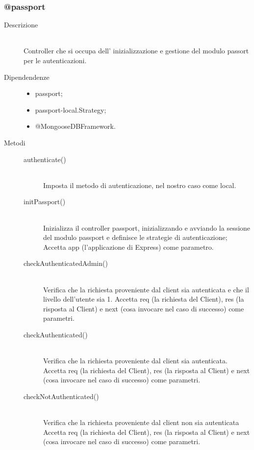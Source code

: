 \subsubsection{@passport}
\begin{description}
 \item[Descrizione] \hfill \\
Controller che si occupa dell' inizializzazione e gestione del modulo passort per le autenticazioni.
\item[Dipendendenze] \hfill
  \begin{itemize}
   \item passport;
   \item passport-local.Strategy;
   \item @MongooseDBFramework.
  \end{itemize}
   \item[Metodi] \hfill
    \begin{description}
     \item[authenticate()] \hfill \\
     Imposta il metodo di autenticazione, nel nostro caso come local.
     \item[initPassport()] \hfill \\
     Inizializza il controller passport, inizializzando e avviando la sessione del modulo passport e definisce le strategie di autenticazione; Accetta app (l'applicazione di Express) come parametro.
     \item[checkAuthenticatedAdmin()] \hfill \\
     Verifica che la richiesta proveniente dal client sia autenticata e che il livello dell'utente sia 1. Accetta req (la richiesta del Client), res (la risposta al Client) e next (cosa invocare nel caso di successo) come parametri.
     \item[checkAuthenticated()] \hfill \\
     Verifica che la richiesta proveniente dal client sia autenticata. Accetta req (la richiesta del Client), res (la risposta al Client) e next (cosa invocare nel caso di successo) come parametri.
     \item[checkNotAuthenticated()] \hfill \\
     Verifica che la richiesta proveniente dal client non sia autenticata Accetta req (la richiesta del Client), res (la risposta al Client) e next (cosa invocare nel caso di successo) come parametri.
     \end{description}
\end{description}


